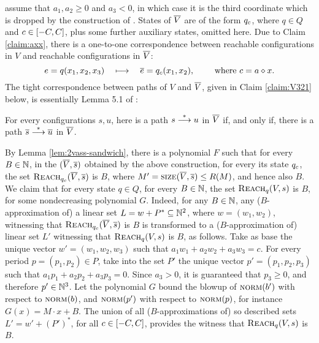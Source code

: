 \begin{appendixproof}
\Wlog assume that $a_1, a_2 \geq 0$ and $a_3<0$,
in which case it is the third coordinate which is dropped 
by the construction of \cite[Lemma 5.1]{Zhang-geom}.
States of $\overline{V}$ are of the form $q_{c}$, where $q\in Q$ and $c\in[-C, C]$, 
plus some further auxiliary states, omitted here.
Due to Claim \ref{claim:axx},
there is a one-to-one correspondence between
reachable configurations in $V$ and reachable configurations in $\overline{V}$:
\[
e = q(x_1, x_2, x_3) \quad \longmapsto \quad
\overline{e} = q_{c}(x_1, x_2), 
\qquad
\text{ where } c = a \diamond x.
\]
%
The tight correspondence between paths of $V$ and $\overline{V}$,
 given in Claim \ref{claim:V321} below, is essentially 
Lemma 5.1 of \cite{Zhang-geom}:
%
\begin{claim} \label{claim:V321}
For every configurations $s,u$,
here is a path $s \stackrel{*}{\longrightarrow} u$ in $\overline{V}$
if, and only if,
there is a path $\overline{s} \stackrel{*}{\longrightarrow} \overline{u}$ in $\overline{V}$.
\end{claim}
%
By Lemma \ref{lem:2vass-sandwich}, there is a polynomial $F$ such that 
for every $B\in\mathbb{N}$,
in the \dvass
$(\overline{V}, \overline{s})$ obtained by the above construction, 
for every its state $q_{c}$, the set 
$\textsc{Reach}_{q_{c}}(\overline{V}, \overline{s})$ is  {$B$}, where
$M'=\textsc{size}(\overline{V}, \overline{s}) \leq R(M)$, and hence also
 {$B$}.
We claim that for every state $q\in Q$, for every $B\in\mathbb{N}$, 
the set $\textsc{Reach}_q(V,s)$ is  {$B$}, for some nondecreasing polynomial $G$.
Indeed, for any $B\in\mathbb{N}$, any ($B$-approximation of) a linear set 
$L = w + P^*\subseteq \mathbb{N}^2$, where $w=(w_1, w_2)$, witnessing that
$\textsc{Reach}_{q_{c}}(\overline{V},\overline{s})$  is  {$B$}
is transformed to a ($B$-approximation of) linear set $L'$ witnessing that
$\textsc{Reach}_{q}(V,s)$  is  {$B$}, as follows.
Take as base the unique vector $w'=(w_1, w_2, w_3)$ such that $a_1 w_1 + a_2 w_2 + a_3 w_3 = c$.
For every period $p=(p_1, p_2) \in P$, take into the set $P'$  the unique vector
$p'=(p_1, p_2, p_3)$ such that $a_1 p_1 + a_2 p_2 + a_3 p_3 = 0$.
Since $a_3>0$, it is guaranteed that $p_3 \geq 0$, and therefore $p'\in\mathbb{N}^3$.
Let the polynomial $G$ bound the blowup of $\textsc{norm}(b')$ with respect to $\textsc{norm}(b)$, and 
$\textsc{norm}(p')$ with respect to $\textsc{norm}(p)$, for instance
$G(x) = M \cdot x + B$.
The union of all ($B$-approximations of) 
so described sets $L' = w' + (P')^*$, for all $c\in[-C, C]$, provides the witness that
$\textsc{Reach}_{q}(V,s)$ is  {$B$}.


\end{appendixproof}
